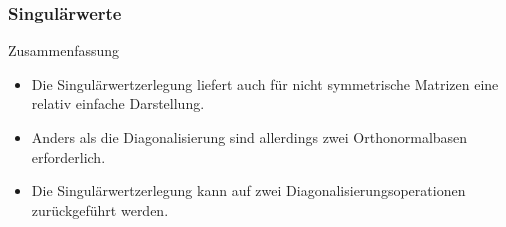 \documentclass{beamer}
\renewcommand{\ae}{\"a}
\newcommand{\ue}{\"u}
\newcommand{\mytitle}{Singul\ae rwerte}
\begin{document}
\begin{frame}\frametitle{\mytitle}
	\begin{block}{Zusammenfassung}
	\begin{itemize}
		\item Die Singul\ae rwertzerlegung liefert auch f\ue r nicht symmetrische Matrizen eine relativ einfache Darstellung.
		\item Anders als die Diagonalisierung sind allerdings zwei Orthonormalbasen erforderlich.
		\item Die Singul\ae rwertzerlegung kann auf zwei Diagonalisierungsoperationen zur\ue ckgef\ue hrt werden.
	\end{itemize}
	\end{block}
\end{frame}
\end{document}
